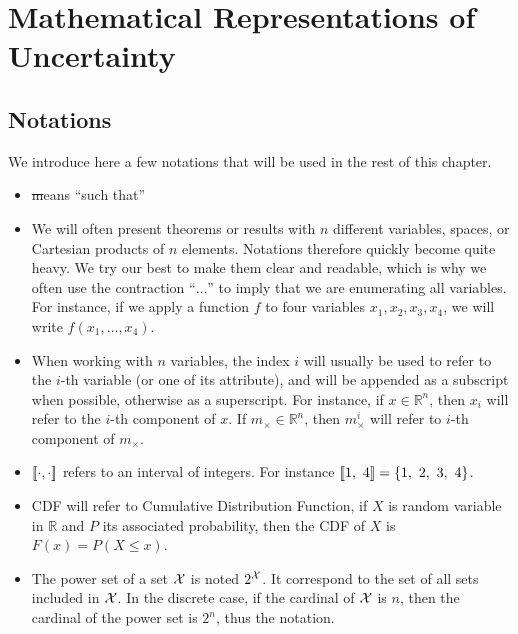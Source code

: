 \chapter{Mathematical Representations of Uncertainty}

\section{Notations}
We introduce here a few notations that will be used in the rest of this chapter. 
\begin{itemize}
    \item \st means ``such that''
    \item We will often present theorems or results with $n$ different variables, spaces, or Cartesian products of $n$ elements. Notations therefore quickly become quite heavy. We try our best to make them clear and readable, which is why we often use the contraction ``$\dots$'' to imply that we are enumerating all variables. For instance, if we apply a function $f$ to four variables $x_1, x_2, x_3, x_4$, we will write $f(x_1, \dots, x_4)$.
    \item When working with $n$ variables, the index $i$ will usually be used to refer to the $i$-th variable (or one of its attribute), and will be appended as a subscript when possible, otherwise as a superscript. For instance, if $x\in\mathbb{R}^n$, then $x_i$ will refer to the $i$-th component of $x$. If $m_\times\in\mathbb{R}^n$, then $m_\times^i$ will refer to $i$-th component of $m_\times$.
    \item ${[\![}\cdot,\cdot{]\!]}$ refers to an interval of integers. For instance ${[\![}1,~4{]\!]}=\{1,~2,~3,~4\}$. 
    \item CDF will refer to Cumulative Distribution Function, \ie if $X$ is random variable in $\mathbb{R}$ and $P$ its associated probability, then the CDF of $X$ is $F(x)=P(X\leqslant x)$.
    \item The power set of a set ${\mathcal{X}}$ is noted $2^{\mathcal{X}}$. It correspond to the set of all sets included in ${\mathcal{X}}$. In the discrete case, if the cardinal of ${\mathcal{X}}$ is $n$, then the cardinal of the power set is $2^n$, thus the notation.
\end{itemize}



